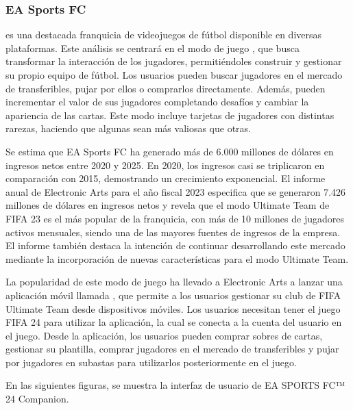 \subsubsection{EA Sports FC}
 es una destacada franquicia de videojuegos de fútbol disponible en diversas plataformas. 
Este análisis se centrará en el modo de juego , 
que busca transformar la interacción de los jugadores, permitiéndoles construir y gestionar su propio equipo de fútbol. Los usuarios pueden buscar jugadores en el mercado de transferibles, 
pujar por ellos o comprarlos directamente. Además, pueden incrementar el valor de sus jugadores completando desafíos y cambiar la apariencia de las cartas. 
Este modo incluye tarjetas de jugadores con distintas rarezas, haciendo que algunas sean más valiosas que otras.

Se estima que EA Sports FC ha generado más de 6.000 millones de dólares en ingresos netos entre 2020 y 2025\cite{sanmartin000MillonesDolares2021}. En 2020, 
los ingresos casi se triplicaron en comparación con 2015, demostrando un crecimiento exponencial. El informe anual de Electronic Arts para el año fiscal 2023\cite{ea2023} 
especifica que se generaron 7.426 millones de dólares en ingresos netos y revela que el modo Ultimate Team de FIFA 23 es el más popular de la franquicia, con más de 10 millones 
de jugadores activos mensuales, siendo una de las mayores fuentes de ingresos de la empresa. El informe también destaca la intención de continuar desarrollando este mercado 
mediante la incorporación de nuevas características para el modo Ultimate Team.

La popularidad de este modo de juego ha llevado a Electronic Arts a lanzar una aplicación móvil llamada , 
que permite a los usuarios gestionar su club de FIFA Ultimate Team desde dispositivos móviles. Los usuarios necesitan tener el juego FIFA 24 para utilizar la aplicación, 
la cual se conecta a la cuenta del usuario en el juego. Desde la aplicación, los usuarios pueden comprar sobres de cartas, gestionar su plantilla, 
comprar jugadores en el mercado de transferibles y pujar por jugadores en subastas para utilizarlos posteriormente en el juego.

En las siguientes figuras, se muestra la interfaz de usuario de EA SPORTS FC™ 24 Companion.

